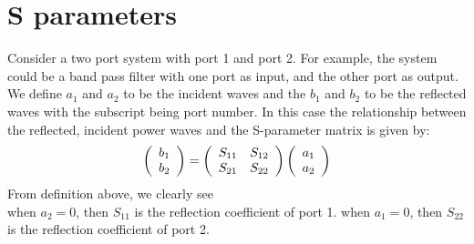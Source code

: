 \documentclass[a4paper]{article}
\begin{document}
\section{S parameters}
Consider a two port system with port 1 and port 2. For example, the system could be a band pass filter with one port as input, and the other port as output. We define $a_1$ and $a_2$ to be the incident waves and the  $b_1$ and $b_2$ to be the reflected waves with the subscript being port number.  
In this case the relationship between the reflected, incident power waves and the S-parameter matrix is given by:
\begin{align*}
	\left(
	\begin{array} {c}
		 b_1 \\
		 b_2\\
	\end{array}
	\right)
		= 
	\left( 
	\begin{array} {c c}
	 	S_{11} & S_{12} \\
		S_{21} & S_{22} \\
	\end{array}
	\right)
	\left(
	\begin{array}{c}
		 a_1 \\
		 a_2\\
	\end{array}
	\right)
\end{align*}
From definition above, we clearly see\\
when $a_{2} = 0$, then $S_{11}$ is the reflection coefficient of port 1. 
when $a_{1} = 0$, then $S_{22}$ is the reflection coefficient of port 2. 
\end{document}
